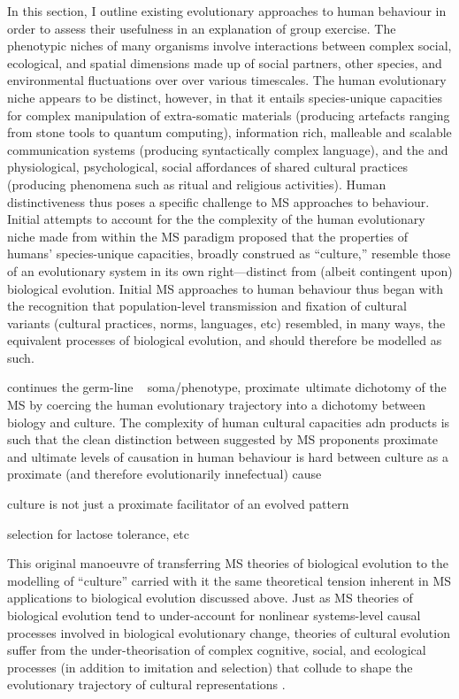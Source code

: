 In this section, I outline existing evolutionary approaches to human behaviour in order to assess their usefulness in an explanation of group exercise.
The phenotypic niches of many organisms involve interactions between complex social,  ecological, and spatial dimensions made up of social partners, other species, and environmental fluctuations over over various timescales. The human evolutionary niche appears to be distinct, however, in that it entails species-unique capacities for complex manipulation of extra-somatic materials (producing artefacts ranging from stone tools to quantum computing), information rich, malleable and scalable communication systems (producing syntactically complex language), and the and physiological, psychological, social affordances of shared cultural practices (producing phenomena such as ritual and religious activities).  Human distinctiveness thus poses a specific challenge to MS approaches to behaviour.  Initial attempts to account for the the complexity of the human evolutionary niche made from within the MS paradigm proposed that the properties of humans' species-unique capacities, broadly construed as ``culture,'' resemble those of an evolutionary system in its own right---distinct from (albeit contingent upon) biological evolution.  Initial MS approaches to human behaviour thus began with the recognition that population-level transmission and fixation of cultural variants (cultural practices, norms, languages, etc) resembled, in many ways, the equivalent processes of biological evolution, and should therefore be modelled as such.

continues the germ-line ~ soma/phenotype, proximate~ultimate dichotomy of the MS by coercing the human evolutionary trajectory into a dichotomy between biology and culture.  The complexity of human cultural capacities adn products is such that the clean distinction between suggested by MS proponents proximate and ultimate levels of causation in human behaviour is hard  between culture as a proximate (and therefore evolutionarily innefectual) cause

culture is  not just a proximate facilitator of an evolved pattern

selection for lactose tolerance, etc


This original manoeuvre of transferring MS theories of biological evolution to the modelling of ``culture'' carried with it the same theoretical tension inherent in MS applications to biological evolution discussed above. Just as MS theories of biological evolution tend to under-account for nonlinear systems-level causal processes involved in biological evolutionary change, theories of cultural evolution suffer from the under-theorisation of complex cognitive, social, and ecological processes (in addition to imitation and selection) that collude to shape the evolutionary trajectory of cultural representations \citep{Mesoudi2017}.



